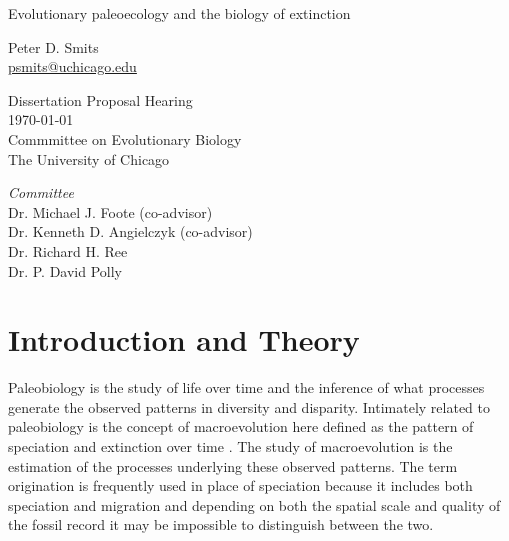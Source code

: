 \documentclass[12pt,letterpaper]{article}
\begin{document}
\setcounter{secnumdepth}{0}

\begin{titlepage}
  \begin{center}
    \huge{Evolutionary paleoecology and the biology of extinction}

    \vspace{1.5cm}

    \large{Peter D. Smits \\}
    \footnotesize{\href{mailto:psmits@uchicago.edu}{psmits@uchicago.edu}}

    \vspace{1.5cm}

    Dissertation Proposal Hearing \\
    \today \\
    Commmittee on Evolutionary Biology \\
    The University of Chicago

    \vspace{1.5cm}

    \textit{Committee} \\
    Dr. Michael J. Foote (co-advisor) \\
    Dr. Kenneth D. Angielczyk (co-advisor) \\
    Dr. Richard H. Ree \\
    Dr. P. David Polly
  \end{center}
\end{titlepage}

\linenumbers
\modulolinenumbers[2]


\section{Introduction and Theory}
Paleobiology is the study of life over time and the inference of what processes generate the observed patterns in diversity and disparity. Intimately related to paleobiology is the concept of macroevolution here defined as the pattern of speciation and extinction over time \citep{Jablonski2008a}. The study of macroevolution is the estimation of the processes underlying these observed patterns. The term origination is frequently used in place of speciation because it includes both speciation and migration and depending on both the spatial scale and quality of the fossil record it may be impossible to distinguish between the two.
\end{document}
